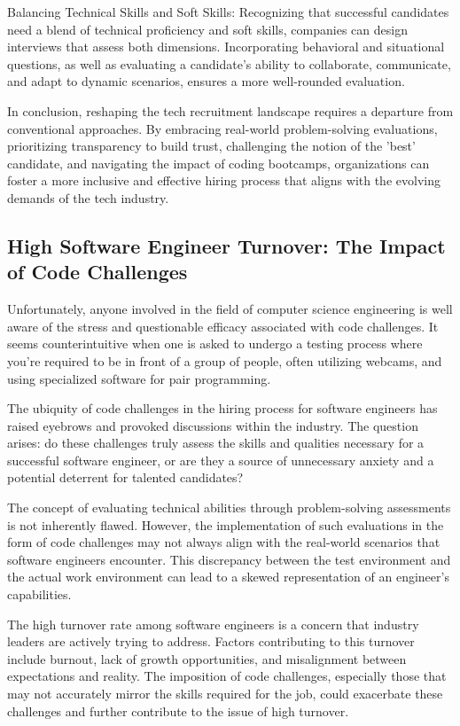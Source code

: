 \documentclass[
    a4paper, %
    10pt, %
    unnumberedsections, %
    twoside, %
]{LTJournalArticle}
\begin{document}
Balancing Technical Skills and Soft Skills:
Recognizing that successful candidates need a blend of technical proficiency and soft skills, companies can design interviews that assess both dimensions. Incorporating behavioral and situational questions, as well as evaluating a candidate's ability to collaborate, communicate, and adapt to dynamic scenarios, ensures a more well-rounded evaluation.

In conclusion, reshaping the tech recruitment landscape requires a departure from conventional approaches. By embracing real-world problem-solving evaluations, prioritizing transparency to build trust, challenging the notion of the 'best' candidate, and navigating the impact of coding bootcamps, organizations can foster a more inclusive and effective hiring process that aligns with the evolving demands of the tech industry.




\subsection{High Software Engineer Turnover: The Impact of Code Challenges}

Unfortunately, anyone involved in the field of computer science engineering is well aware of the stress and questionable efficacy associated with code challenges. It seems counterintuitive when one is asked to undergo a testing process where you're required to be in front of a group of people, often utilizing webcams, and using specialized software for pair programming.

The ubiquity of code challenges in the hiring process for software engineers has raised eyebrows and provoked discussions within the industry. The question arises: do these challenges truly assess the skills and qualities necessary for a successful software engineer, or are they a source of unnecessary anxiety and a potential deterrent for talented candidates?

The concept of evaluating technical abilities through problem-solving assessments is not inherently flawed. However, the implementation of such evaluations in the form of code challenges may not always align with the real-world scenarios that software engineers encounter. This discrepancy between the test environment and the actual work environment can lead to a skewed representation of an engineer's capabilities.

The high turnover rate among software engineers is a concern that industry leaders are actively trying to address. Factors contributing to this turnover include burnout, lack of growth opportunities, and misalignment between expectations and reality. The imposition of code challenges, especially those that may not accurately mirror the skills required for the job, could exacerbate these challenges and further contribute to the issue of high turnover.
\end{document}
